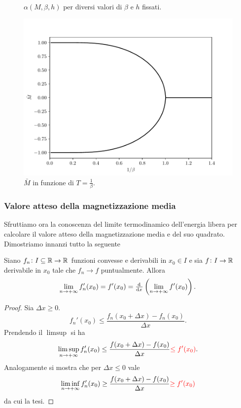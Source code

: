 \iffigureon
\begin{figure}[p]
    \centering
    \subfloat{}
    \subfloat{} \\
    \subfloat{}
    \subfloat{}
    \caption{$ \alpha(M,\beta,h) $ per diversi valori di $ \beta $ e $ h $ fissati.}
    \label{fig:alpha}
\end{figure}
\begin{figure}[p]
    \centering
    \includegraphics[scale=0.8]{img/cw/transizione.pdf}
    \caption{$ \bar{M} $ in funzione di $ T = \frac{1}{\beta}$.}
    \label{fig:transizione}
\end{figure}
\fi

\subsubsection{Valore atteso della magnetizzazione media}
Sfruttiamo ora la conoscenza del limite termodinamico dell'energia libera per calcolare il valore atteso della magnetizzazione media e del suo quadrato. Dimostriamo innanzi tutto la seguente
\begin{proposition}
    Siano $ f_n\colon I\subseteq\mathbb{R} \to \mathbb{R} $ funzioni convesse e derivabili in $ x_0 \in I $ e sia $ f\colon I\to\mathbb{R} $ derivabile in $ x_0 $ tale che $ f_n \to f $ puntualmente. Allora
    \[ \lim_{n \to +\infty} f_n'(x_0) = f'(x_0) = \od{}{x} \left( \lim_{n \to +\infty} f'(x_0) \right). \]
\end{proposition}
\begin{proof}\label{prop:convessascambio}
    Sia $ \Delta x \geq 0 $.
    \[ f_n'(x_0) \leq \frac{f_n(x_0+\Delta x)-f_n(x_0)}{\Delta x}. \]
    Prendendo il $ \limsup $ si ha
    \[ \limsup_{n\to +\infty} f'_n(x_0) \leq \frac{f(x_0+\Delta x)-f(x_0)}{\Delta x} \textcolor{red}{\leq f'(x_0)}. \]
    Analogamente si mostra che per $ \Delta x \leq 0 $ vale
    \[ \liminf_{n\to +\infty} f_n'(x_0) \geq \frac{f(x_0+\Delta x)-f(x_0)}{\Delta x} \textcolor{red}{\geq f'(x_0)} \]
    da cui la tesi.
\end{proof}

